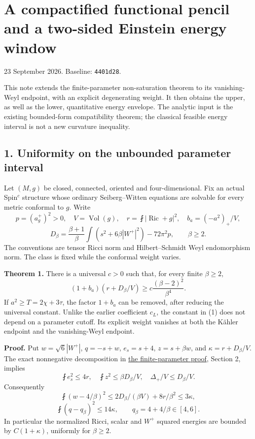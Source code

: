 \documentclass[
  11pt,
]{article}
\author{}
\date{23 September 2026}
\begin{document}
\hypertarget{a-compactified-functional-pencil-and-a-two-sided-einstein-energy-window}{%
\section{A compactified functional pencil and a two-sided Einstein
energy
window}\label{a-compactified-functional-pencil-and-a-two-sided-einstein-energy-window}}

23 September 2026. Baseline: \texttt{4401d28}.

This note extends the finite-parameter non-saturation theorem to its
vanishing-Weyl endpoint, with an explicit degenerating weight. It then
obtains the upper, as well as the lower, quantitative energy envelope.
The analytic input is the existing bounded-form compatibility theorem;
the classical feasible energy interval is not a new curvature
inequality.

\hypertarget{uniformity-on-the-unbounded-parameter-interval}{%
\subsection{1. Uniformity on the unbounded parameter
interval}\label{uniformity-on-the-unbounded-parameter-interval}}

Let \((M,g)\) be closed, connected, oriented and four-dimensional. Fix
an actual Spin\(^c\) structure whose ordinary Seiberg--Witten equations
are solvable for every metric conformal to \(g\). Write \[
 p=(a_g^+)^2>0,\quad V=\operatorname{Vol}(g),\quad
 r=\fint|\operatorname{Ric}+g|^2,\quad b_a=(-a^2)_+/V,
\] \[
 D_\beta=\frac{\beta+1}{\beta}\int(s^2+6\beta|W^+|^2)
                 -72\pi^2p,\qquad \beta\ge2.
\] The conventions are tensor Ricci norm and Hilbert--Schmidt Weyl
endomorphism norm. The class is fixed while the conformal weight varies.

\textbf{Theorem 1.} There is a universal \(c>0\) such that, for every
finite \(\beta\ge2\), \[
 \boxed{(1+b_a)(r+D_\beta/V)
       \ge c\frac{(\beta-2)^2}{\beta^4}.}                 \tag{1}
\] If \(a^2\ge T=2\chi+3\tau\), the factor \(1+b_a\) can be removed,
after reducing the universal constant. Unlike the earlier coefficient
\(c_L\), the constant in (1) does not depend on a parameter cutoff. Its
explicit weight vanishes at both the Kähler endpoint and the
vanishing-Weyl endpoint.

\textbf{Proof.} Put \(w=\sqrt6|W^+|\), \(q=-s+w\), \(e_s=s+4\),
\(z=s+\beta w\), and \(\kappa=r+D_\beta/V\). The exact nonnegative
decomposition in \href{line1_functional_pencil.md}{the finite-parameter
proof}, Section 2, implies \[
 \fint e_s^2\le4r,\quad \fint z^2\le\beta D_\beta/V,
 \quad\Delta_+/V\le D_\beta/V.
\] Consequently \[
 \fint(w-4/\beta)^2
 \le2D_\beta/(\beta V)+8r/\beta^2\le3\kappa,
\] \[
 \fint(q-q_\beta)^2\le14\kappa,
 \qquad q_\beta=4+4/\beta\in[4,6].                       \tag{2}
\] In particular the normalized Ricci, scalar and \(W^+\) squared
energies are bounded by \(C(1+\kappa)\), uniformly for \(\beta\ge2\).
\end{document}
